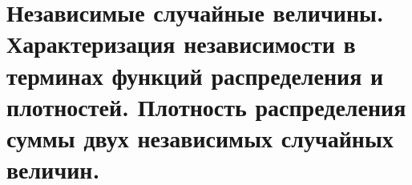 \section{Независимые случайные величины. Характеризация независимости в терминах функций распределения и плотностей. Плотность распределения суммы двух независимых случайных величин.}